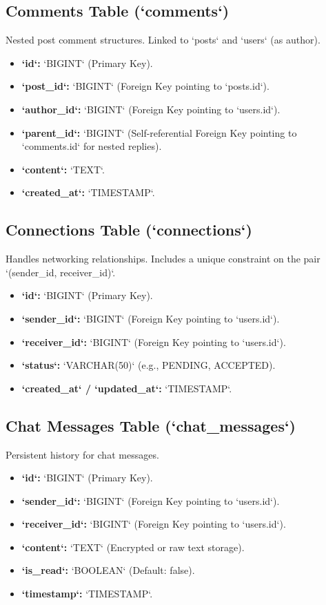 \subsection{Comments Table (`comments`)}
Nested post comment structures. Linked to `posts` and `users` (as author).
\begin{itemize}
    \item \textbf{`id`:} `BIGINT` (Primary Key).
    \item \textbf{`post\_id`:} `BIGINT` (Foreign Key pointing to `posts.id`).
    \item \textbf{`author\_id`:} `BIGINT` (Foreign Key pointing to `users.id`).
    \item \textbf{`parent\_id`:} `BIGINT` (Self-referential Foreign Key pointing to `comments.id` for nested replies).
    \item \textbf{`content`:} `TEXT`.
    \item \textbf{`created\_at`:} `TIMESTAMP`.
\end{itemize}

\subsection{Connections Table (`connections`)}
Handles networking relationships. Includes a unique constraint on the pair `(sender\_id, receiver\_id)`.
\begin{itemize}
    \item \textbf{`id`:} `BIGINT` (Primary Key).
    \item \textbf{`sender\_id`:} `BIGINT` (Foreign Key pointing to `users.id`).
    \item \textbf{`receiver\_id`:} `BIGINT` (Foreign Key pointing to `users.id`).
    \item \textbf{`status`:} `VARCHAR(50)` (e.g., PENDING, ACCEPTED).
    \item \textbf{`created\_at` / `updated\_at`:} `TIMESTAMP`.
\end{itemize}

\subsection{Chat Messages Table (`chat\_messages`)}
Persistent history for chat messages.
\begin{itemize}
    \item \textbf{`id`:} `BIGINT` (Primary Key).
    \item \textbf{`sender\_id`:} `BIGINT` (Foreign Key pointing to `users.id`).
    \item \textbf{`receiver\_id`:} `BIGINT` (Foreign Key pointing to `users.id`).
    \item \textbf{`content`:} `TEXT` (Encrypted or raw text storage).
    \item \textbf{`is\_read`:} `BOOLEAN` (Default: false).
    \item \textbf{`timestamp`:} `TIMESTAMP`.
\end{itemize}

